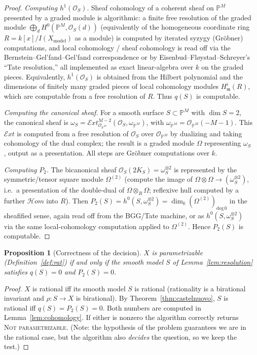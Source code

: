 \documentclass{amsart}
\theoremstyle{plain}
\newtheorem{proposition}{Proposition}
\theoremstyle{definition}
\newcommand{\PP}{\mathbb{P}}
\newcommand{\cO}{\mathcal{O}}
\begin{document}
\begin{proof}
\emph{Computing $h^1(\cO_S)$.}  Sheaf cohomology of a coherent sheaf on $\PP^M$
presented by a graded module is algorithmic: a finite free resolution of the
graded module $\bigoplus_d H^0(\PP^M,\cO_S(d))$ (equivalently of the homogeneous
coordinate ring $R=k[x]/I(X_{\mathrm{model}})$ as a module) is computed by
iterated syzygy (Gr\"obner) computations, and local cohomology / sheaf
cohomology is read off via the Bernstein--Gel'fand--Gel'fand correspondence or by
Eisenbud--Fl\o ystad--Schreyer's ``Tate resolution,'' all implemented as exact
linear-algebra over $k$ on the graded pieces.  Equivalently, $h^1(\cO_S)$ is
obtained from the Hilbert polynomial and the dimensions of finitely many graded
pieces of local cohomology modules $H^i_{\mathfrak m}(R)$, which are computable
from a free resolution of $R$.  Thus $q(S)$ is computable.

\emph{Computing the canonical sheaf.}  For a smooth surface $S\subset\PP^M$ with
$\dim S=2$, the canonical sheaf is
$\omega_S=\mathcal{E}xt^{M-2}_{\cO_{\PP^M}}(\cO_S,\omega_{\PP^M})$, with
$\omega_{\PP^M}=\cO_{\PP^M}(-M-1)$.  This $\mathcal{E}xt$ is computed from a free
resolution of $\cO_S$ over $\cO_{\PP^M}$ by dualizing and taking cohomology of the
dual complex; the result is a graded module $\Omega$ representing $\omega_S$,
output as a presentation.  All steps are Gr\"obner computations over $k$.

\emph{Computing $P_2$.}  The bicanonical sheaf $\cO_S(2K_S)=\omega_S^{\otimes2}$
is represented by the symmetric/tensor square module $\Omega^{(2)}$ (compute the
image of $\Omega\otimes\Omega\to(\omega_S^{\otimes2})$, i.e.\ a presentation of
the double-dual of $\Omega\otimes_R\Omega$; reflexive hull computed by a further
$\mathcal{H}om$ into $R$).  Then $P_2(S)=h^0(S,\omega_S^{\otimes2})=
\dim_k(\Omega^{(2)})_{\mathrm{deg}\,0}$ in the sheafified sense, again read off
from the BGG/Tate machine, or as
$h^0(S,\omega_S^{\otimes2})$ via the same local-cohomology computation applied
to $\Omega^{(2)}$.  Hence $P_2(S)$ is computable.
\end{proof}

\begin{proposition}[Correctness of the decision]\label{prop:decision}
$X$ is parametrizable (Definition~\ref{def:rat}) if and only if the smooth model
$S$ of Lemma~\ref{lem:resolution} satisfies $q(S)=0$ and $P_2(S)=0$.
\end{proposition}

\begin{proof}
$X$ is rational iff its smooth model $S$ is rational (rationality is a
birational invariant and $\rho\colon S\to X$ is birational).  By
Theorem~\ref{thm:castelnuovo}, $S$ is rational iff $q(S)=P_2(S)=0$.  Both numbers
are computed in Lemma~\ref{lem:cohomology}.  If either is nonzero the algorithm
correctly returns \textsc{Not parametrizable}.  (Note: the hypothesis of the
problem guarantees we are in the rational case, but the algorithm also
\emph{decides} the question, so we keep the test.)
\end{proof}
\end{document}
